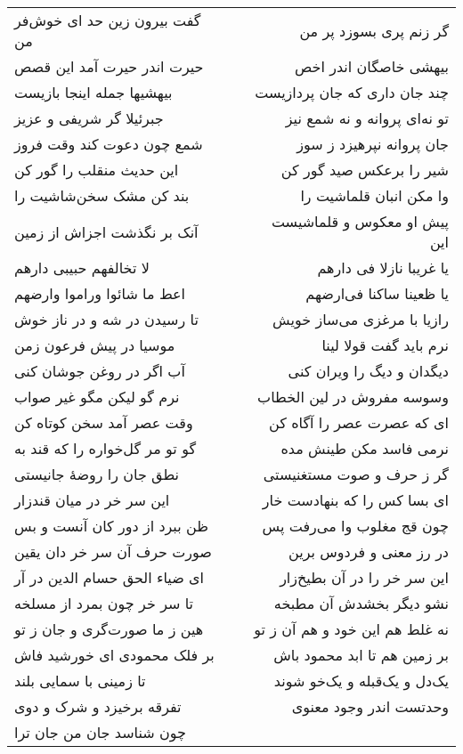 \begin{center}
\begin{longtable}{l p{0.5cm} r}
\\
گفت بیرون زین حد ای خوش‌فر من
&&
گر زنم پری بسوزد پر من
\\
حیرت اندر حیرت آمد این قصص
&&
بیهشی خاصگان اندر اخص
\\
بیهشیها جمله اینجا بازیست
&&
چند جان داری که جان پردازیست
\\
جبرئیلا گر شریفی و عزیز
&&
تو نه‌ای پروانه و نه شمع نیز
\\
شمع چون دعوت کند وقت فروز
&&
جان پروانه نپرهیزد ز سوز
\\
این حدیث منقلب را گور کن
&&
شیر را برعکس صید گور کن
\\
بند کن مشک سخن‌شاشیت را
&&
وا مکن انبان قلماشیت را
\\
آنک بر نگذشت اجزاش از زمین
&&
پیش او معکوس و قلماشیست این
\\
لا تخالفهم حبیبی دارهم
&&
یا غریبا نازلا فی دارهم
\\
اعط ما شائوا وراموا وارضهم
&&
یا ظعینا ساکنا فی‌ارضهم
\\
تا رسیدن در شه و در ناز خوش
&&
رازیا با مرغزی می‌ساز خویش
\\
موسیا در پیش فرعون زمن
&&
نرم باید گفت قولا لینا
\\
آب اگر در روغن جوشان کنی
&&
دیگدان و دیگ را ویران کنی
\\
نرم گو لیکن مگو غیر صواب
&&
وسوسه مفروش در لین الخطاب
\\
وقت عصر آمد سخن کوتاه کن
&&
ای که عصرت عصر را آگاه کن
\\
گو تو مر گل‌خواره را که قند به
&&
نرمی فاسد مکن طینش مده
\\
نطق جان را روضهٔ جانیستی
&&
گر ز حرف و صوت مستغنیستی
\\
این سر خر در میان قندزار
&&
ای بسا کس را که بنهادست خار
\\
ظن ببرد از دور کان آنست و بس
&&
چون قج مغلوب وا می‌رفت پس
\\
صورت حرف آن سر خر دان یقین
&&
در رز معنی و فردوس برین
\\
ای ضیاء الحق حسام الدین در آر
&&
این سر خر را در آن بطیخ‌زار
\\
تا سر خر چون بمرد از مسلخه
&&
نشو دیگر بخشدش آن مطبخه
\\
هین ز ما صورت‌گری و جان ز تو
&&
نه غلط هم این خود و هم آن ز تو
\\
بر فلک محمودی ای خورشید فاش
&&
بر زمین هم تا ابد محمود باش
\\
تا زمینی با سمایی بلند
&&
یک‌دل و یک‌قبله و یک‌خو شوند
\\
تفرقه برخیزد و شرک و دوی
&&
وحدتست اندر وجود معنوی
\\
چون شناسد جان من جان ترا

\end{longtable}
\end{center}
